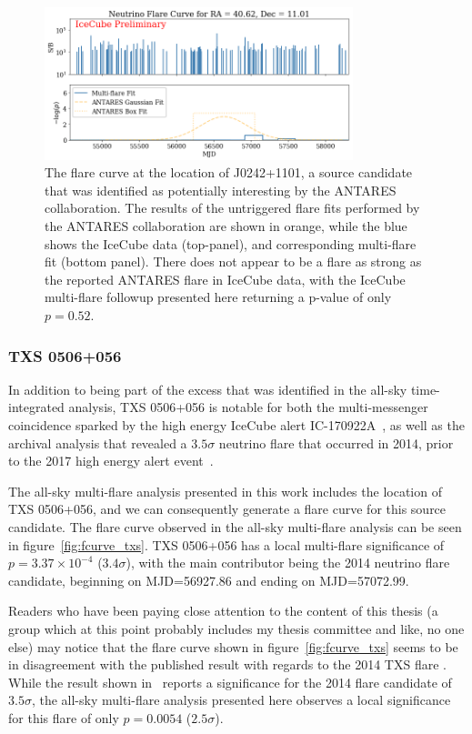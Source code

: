 \begin{figure}[h]
\centering
\includegraphics[width=0.8\textwidth]{figs/J0242+1101.png}
\caption{The flare curve at the location of J0242+1101, a source candidate that was identified as potentially interesting by the ANTARES collaboration. The results of the untriggered flare fits performed by the ANTARES collaboration are shown in orange, while the blue shows the IceCube data (top-panel), and corresponding multi-flare fit (bottom panel). There does not appear to be a flare as strong as the reported ANTARES flare in IceCube data, with the IceCube multi-flare followup presented here returning a p-value of only $p=0.52$.}
\label{fig:J0242}
\end{figure}


\subsubsection{TXS 0506+056}
In addition to being part of the excess that was identified in the all-sky time-integrated analysis, TXS 0506+056 is notable for both the multi-messenger coincidence sparked by the high energy IceCube alert IC-170922A~\cite{TXS_Multimessenger}, as well as the archival analysis that revealed a $3.5 \sigma$ neutrino flare that occurred in 2014, prior to the 2017 high energy alert event~\cite{TXS_Archival}.

The all-sky multi-flare analysis presented in this work includes the location of TXS 0506+056, and we can consequently generate a flare curve for this source candidate. The flare curve observed in the all-sky multi-flare analysis can be seen in figure~\ref{fig:fcurve_txs}. TXS 0506+056 has a local multi-flare significance of $p=3.37 \times 10^{-4}$ ($3.4 \sigma$), with the main contributor being the 2014 neutrino flare candidate, beginning on MJD=56927.86 and ending on MJD=57072.99.

Readers who have been paying close attention to the content of this thesis (a group which at this point probably includes my thesis committee and like, no one else) may notice that the flare curve shown in figure~\ref{fig:fcurve_txs} seems to be in disagreement with the published result with regards to the 2014 TXS flare . While the result shown in~\cite{TXS_Archival} reports a significance for the 2014 flare candidate of $3.5 \sigma$, the all-sky multi-flare analysis presented here observes a local significance for this flare of only $p=0.0054$ ($2.5 \sigma$).

